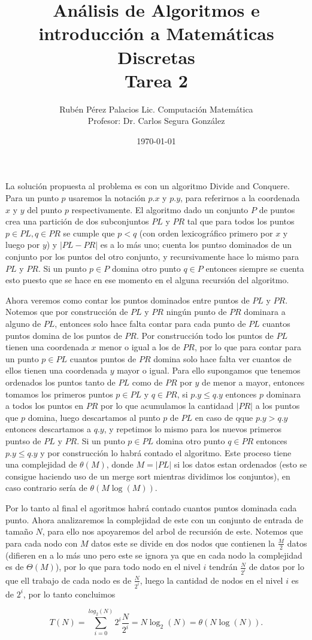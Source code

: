 \documentclass[letterpaper]{article}
\title{Análisis de Algoritmos e introducción a Matemáticas Discretas \\ Tarea 2}
\author{Rubén Pérez Palacios Lic. Computación Matemática\\Profesor: Dr. Carlos Segura González}
\date{\today}
\theoremstyle{definition}
\theoremstyle{lemathm}
\theoremstyle{lemathm}
\theoremstyle{lemathm}
\theoremstyle{lemademthm}
\newcommand{\abs}[1]{\left| #1 \right| }
\newcommand{\pars}[1]{\left( #1 \right) }
\newcommand{\1}{\mathbbm{1}}
\begin{document}
\maketitle

La solución propuesta al problema es con un algoritmo Divide and Conquere. Para un punto $p$ usaremos la notación $p.x$ y $p.y$, para referirnos a la coordenada $x$ y $y$ del punto $p$ respectivamente. El algoritmo dado un conjunto $P$ de puntos crea una partición de dos subconjuntos $PL$ y $PR$ tal que para todos los puntos $p\in PL,q\in PR$ se cumple que $p < q$ (con orden lexicográfico primero por $x$ y luego por $y$) y $\abs{PL-PR}$ es a lo más uno; cuenta los puntso dominados de un conjunto por los puntos del otro conjunto, y recursivamente hace lo mismo para $PL$ y $PR$. Si un punto $p\in P$ domina otro punto $q\in P$ entonces siempre se cuenta esto puesto que se hace en ese momento en el alguna recursión del algoritmo.

Ahora veremos como contar los puntos dominados entre puntos de $PL$ y $PR$. Notemos que por construcción de $PL$ y $PR$ ningún punto de $PR$ dominara a alguno de $PL$, entonces solo hace falta contar para cada punto de $PL$ cuantos puntos domina de los puntos de $PR$. Por construcción todo los puntos de $PL$ tienen una coordenada $x$ menor o igual a los de $PR$, por lo que para contar para un punto $p\in PL$ cuantos puntos de $PR$ domina solo hace falta ver cuantos de ellos tienen una coordenada $y$ mayor o igual. Para ello supongamos que tenemos ordenados los puntos tanto de $PL$ como de $PR$ por $y$ de menor a mayor, entonces tomamos los primeros puntos $p\in PL$ y $q\in PR$, si $p.y\leq q.y$ entonces $p$ dominara a todos los puntos en $PR$ por lo que acumulamos la cantidaad $|PR|$ a los puntos que $p$ domina, luego descartamos al punto $p$ de $PL$ en caso de qque $p.y > q.y$ entonces descartamos a $q.y$, y repetimos lo mismo para los nuevos primeros puntso de $PL$ y $PR$. Si un punto $p\in PL$ domina otro punto $q\in PR$ entonces $p.y\leq q.y$ y por construcción lo habrá contado el algoritmo. Este proceso tiene una complejidad de $\theta\pars{M}$, donde $M=|PL|$ si los datos estan ordenados (esto se consigue haciendo uso de un merge sort mientras dividimos los conjuntos), en caso contrario sería de $\theta\pars{M\log\pars{M}}$.

Por lo tanto al final el agoritmos habrá contado cuantos puntos dominada cada punto. Ahora analizaremos la complejidad de este con un conjunto de entrada de tamaño $N$, para ello nos apoyaremos del arbol de recursión de este. Notemos que para cada nodo con $M$ datos este se divide en dos nodos que contienen la $\frac{M}{2}$ datos (difieren en a lo más uno pero este se ignora ya que en cada nodo la complejidad es de $\Theta(M)$), por lo que para todo nodo en el nivel $i$ tendrán $\frac{N}{2^{i}}$ de datos por lo que ell trabajo de cada nodo es de $\frac{N}{2^{i}}$, luego la cantidad de nodos en el nivel $i$ es de $2^{i}$, por lo tanto concluimos

\[T(N) = \sum_{i=0}^{log_2(N)} 2^{i}\frac{N}{2^{i}} = N\log_2\pars{N} = \theta(N\log\pars{N}).\]
\end{document}
